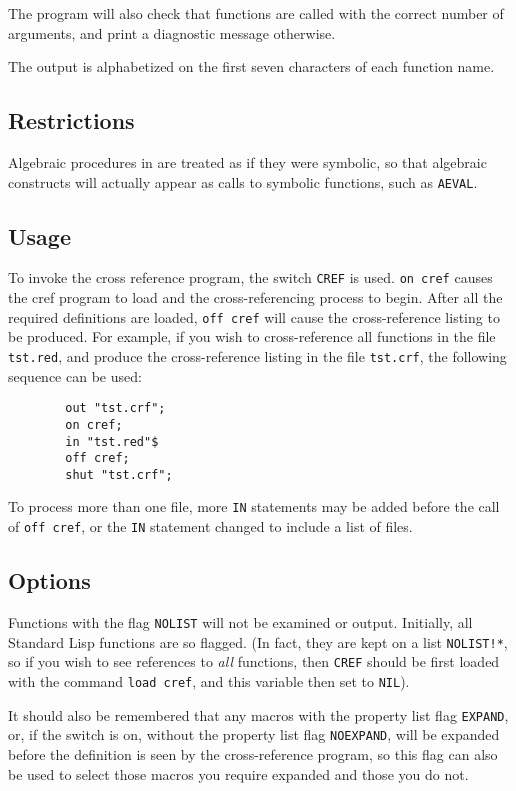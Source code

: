 The program will also check that functions are called with the correct
number of arguments, and print a diagnostic message otherwise.

The output is alphabetized on the first seven characters of each function
name.

\subsection{Restrictions}

Algebraic procedures in {\REDUCE} are treated as if they were symbolic, so
that algebraic constructs will actually appear as calls to symbolic
functions, such as \texttt{AEVAL}.

\subsection{Usage}

To invoke the cross reference program, the switch \texttt{CREF}
 is used. \texttt{on cref} causes the cref program to load
and the cross-referencing process to begin.  After all the required
definitions are loaded, \texttt{off cref} will cause the cross-reference
listing to be produced.  For example, if you wish to cross-reference all
functions in the file \texttt{tst.red}, and produce the cross-reference
listing in the file \texttt{tst.crf}, the following sequence can be used:
\begin{verbatim}
        out "tst.crf";
        on cref;
        in "tst.red"$
        off cref;
        shut "tst.crf";
\end{verbatim}
To process more than one file, more \texttt{IN} statements may be added
before the call of \texttt{off cref}, or the \texttt{IN} statement changed to
include a list of files.

\subsection{Options}

Functions with the flag \texttt{NOLIST} will not be examined or output.
Initially, all Standard Lisp functions are so flagged. (In fact, they are
kept on a list \texttt{NOLIST!*}, so if you wish to see references to 
\emph{all} functions, then \texttt{CREF} should be first loaded with the command \texttt{load cref}, and this variable then set to \texttt{NIL}).

It should also be remembered that any macros with the property list flag
\texttt{EXPAND}, or, if the switch  is on, without the property
list flag \texttt{NOEXPAND}, will be expanded before the definition is seen
by the cross-reference program, so this flag can also be used to select
those macros you require expanded and those you do not.


